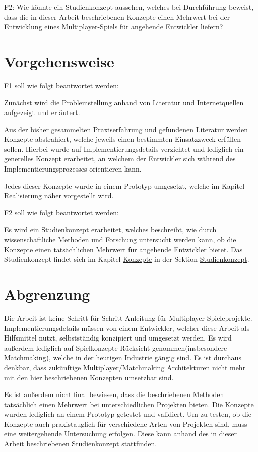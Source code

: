 \label{f2} \textsf{\Large F2:} Wie könnte ein Studienkonzept aussehen, welches bei Durchführung beweist, dass die in dieser Arbeit beschriebenen Konzepte einen Mehrwert bei der Entwicklung eines Multiplayer-Spiels für angehende Entwickler liefern?


\section{Vorgehensweise}

\hyperref[f1]{F1} soll wie folgt beantwortet werden:

Zunächst wird die Problemstellung anhand von Literatur und Internetquellen aufgezeigt und erläutert. 

Aus der bisher gesammelten Praxiserfahrung und gefundenen Literatur werden Konzepte abstrahiert, welche jeweils einen bestimmten Einsatzzweck erfüllen sollen. Hierbei wurde auf Implementierungsdetails verzichtet und lediglich ein generelles Konzept erarbeitet, an welchem der Entwickler sich während des Implementierungsprozesses orientieren kann.

Jedes dieser Konzepte wurde in einem Prototyp umgesetzt, welche im Kapitel \hyperref[sec:realisierung]{Realisierung} näher vorgestellt wird.

\hyperref[f2]{F2} soll wie folgt beantwortet werden:

Es wird ein Studienkonzept erarbeitet, welches beschreibt, wie durch wissenschaftliche Methoden und Forschung untersucht werden kann, ob die Konzepte einen tatsächlichen Mehrwert für angehende Entwickler bietet. Das Studienkonzept findet sich im Kapitel \hyperref[sec:konzepte]{Konzepte} in der Sektion \hyperref[studienkonzept]{Studienkonzept}.

\section{Abgrenzung}

Die Arbeit ist keine Schritt-für-Schritt Anleitung für Multiplayer-Spieleprojekte. Implementierungsdetails müssen von einem Entwickler, welcher diese Arbeit als Hilfsmittel nutzt, selbstständig konzipiert und umgesetzt werden. Es wird außerdem lediglich auf Spielkonzepte Rücksicht genommen(insbesondere Matchmaking), welche in der heutigen Industrie gängig sind\cite{Wikipedia.2021b}. Es ist durchaus denkbar, dass zukünftige Multiplayer/Matchmaking Architekturen nicht mehr mit den hier beschriebenen Konzepten umsetzbar sind.

Es ist außerdem nicht final bewiesen, dass die beschriebenen Methoden tatsächlich einen Mehrwert bei unterschiedlichen Projekten bieten. Die Konzepte wurden lediglich an einem Prototyp getestet und validiert. Um zu testen, ob die Konzepte auch praxistauglich für verschiedene Arten von Projekten sind, muss eine weitergehende Untersuchung erfolgen. Diese kann anhand des in dieser Arbeit beschriebenen \hyperref[studienkonzept]{Studienkonzept} stattfinden. 

